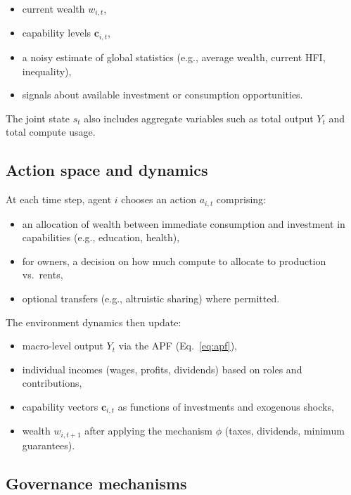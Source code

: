 \documentclass{article}
\begin{document}
\begin{itemize}
  \item current wealth $w_{i,t}$,
  \item capability levels $\mathbf{c}_{i,t}$,
  \item a noisy estimate of global statistics (e.g., average wealth, current HFI, inequality),
  \item signals about available investment or consumption opportunities.
\end{itemize}

The joint state $s_t$ also includes aggregate variables such as total output $Y_t$ and total compute usage.

\subsection{Action space and dynamics}
\label{subsec:actions}

At each time step, agent $i$ chooses an action $a_{i,t}$ comprising:

\begin{itemize}
  \item an allocation of wealth between immediate consumption and investment in capabilities (e.g., education, health),
  \item for owners, a decision on how much compute to allocate to production vs.\ rents,
  \item optional transfers (e.g., altruistic sharing) where permitted.
\end{itemize}

The environment dynamics then update:

\begin{itemize}
  \item macro-level output $Y_t$ via the APF (Eq.~\ref{eq:apf}),
  \item individual incomes (wages, profits, dividends) based on roles and contributions,
  \item capability vectors $\mathbf{c}_{i,t}$ as functions of investments and exogenous shocks,
  \item wealth $w_{i,t+1}$ after applying the mechanism $\phi$ (taxes, dividends, minimum guarantees).
\end{itemize}

\subsection{Governance mechanisms}
\label{subsec:mechanisms}
\end{document}
